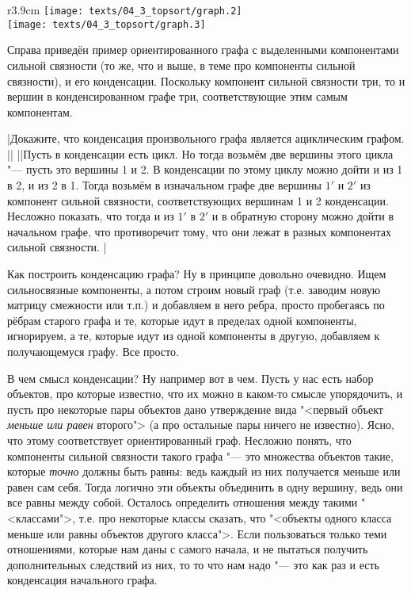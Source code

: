 \begin{wrapfigure}[1]{r}{3.9cm}
\vspace{-0.3cm}
\texttt{[image: texts/04\_3\_topsort/graph.2]}\\[0.2cm]
\texttt{[image: texts/04\_3\_topsort/graph.3]}
\end{wrapfigure}

Справа приведён пример ориентированного графа с выделенными компонентами сильной связности
(то же, что и выше, в теме про компоненты сильной связности), и
его конденсации. Поскольку компонент сильной связности три, то и вершин в конденсированном графе три, 
соответствующие этим самым компонентам.

\task|Докажите, что конденсация произвольного графа является ациклическим графом.
||
||Пусть в конденсации есть цикл. Но тогда возьмём две вершины этого цикла "---
пусть это вершины 1 и 2. В конденсации по этому циклу можно дойти и из 1 в 2, и из 2 в 1. Тогда возьмём в изначальном графе 
две вершины $1'$ и $2'$ из компонент сильной связности, соответствующих вершинам 1 и 2 конденсации. Несложно показать,
что тогда и из $1'$ в $2'$ и в обратную сторону можно дойти в начальном графе, что противоречит тому,
что они лежат в разных компонентах сильной связности.
|\label{condensationisacyclic}

Как построить конденсацию графа? Ну в принципе довольно очевидно. Ищем сильносвязные компоненты, а потом строим новый 
граф (т.е. заводим новую матрицу смежности или т.п.) и добавляем в него ребра,
просто пробегаясь по рёбрам старого графа и те, которые идут в пределах одной компоненты, игнорируем, а те, которые 
идут из одной компоненты в другую, добавляем к получающемуся графу. Все просто.

В чем смысл конденсации? Ну например вот в чем. Пусть у нас есть набор объектов, про которые известно, что их можно
в каком-то смысле упорядочить, и пусть про некоторые пары объектов дано утверждение вида 
"<первый объект \textit{меньше или равен} второго"> (а про остальные пары ничего не известно). 
Ясно, что этому соответствует ориентированный граф. Несложно
понять, что компоненты сильной связности такого графа "--- это множества объектов такие, которые \textit{точно} должны
быть равны: ведь каждый из них получается меньше или равен сам себя. Тогда логично эти объекты объединить в одну вершину,
ведь они все равны между собой. Осталось определить отношения между такими "<классами">, т.е. про некоторые классы
сказать, что "<объекты одного класса меньше или равны объектов другого класса">. Если пользоваться только теми отношениями,
которые нам даны с самого начала, и не пытаться получить дополнительных следствий из них, то то что нам надо "---
это как раз и есть конденсация начального графа.

